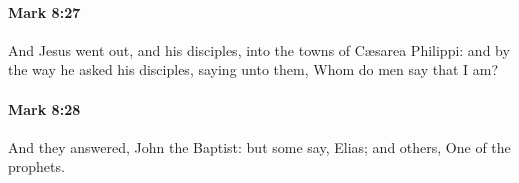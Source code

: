 		\paragraph{Mark 8:27} %
			\label{MARK-8-27}

			And Jesus went out, and his disciples, into the towns of Cæsarea Philippi: and by the way he asked his disciples, saying unto them, Whom do men say that I am?

			\begin{framed}
			\scriptsize
				\begin{compactdesc}
					\item[SBLG] 
				\end{compactdesc}
			\end{framed}

		\paragraph{Mark 8:28} %
			\label{MARK-8-28}

			And they answered, John the Baptist: but some say, Elias; and others, One of the prophets.

